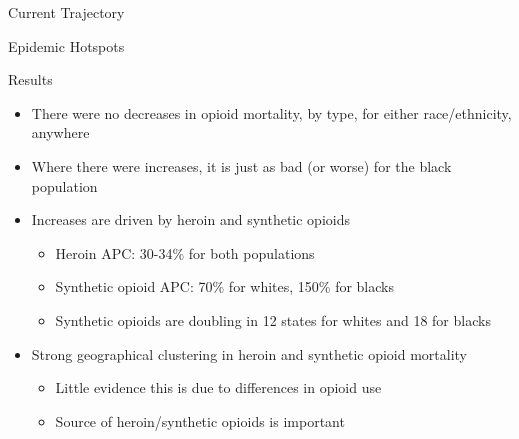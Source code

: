 \documentclass[ignorenonframetext,compress]{beamer}
\providecommand{\tightlist}{%
  \setlength{\itemsep}{0pt}\setlength{\parskip}{0pt}}
\begin{document}
\begin{frame}{Current Trajectory}

\end{frame}

\begin{frame}{Epidemic Hotspots}

\end{frame}

\begin{frame}{Results}

\begin{itemize}[<+->]
\tightlist
\item
  There were no decreases in opioid mortality, by type, for either
  race/ethnicity, anywhere
\item
  Where there were increases, it is just as bad (or worse) for the black
  population
\item
  Increases are driven by heroin and synthetic opioids

  \begin{itemize}[<+->]
  \tightlist
  \item
    Heroin APC: 30-34\% for both populations
  \item
    Synthetic opioid APC: 70\% for whites, 150\% for blacks
  \item
    Synthetic opioids are doubling in 12 states for whites and 18 for
    blacks
  \end{itemize}
\item
  Strong geographical clustering in heroin and synthetic opioid
  mortality

  \begin{itemize}[<+->]
  \tightlist
  \item
    Little evidence this is due to differences in opioid use
  \item
    Source of heroin/synthetic opioids is important
  \end{itemize}
\end{itemize}

\end{frame}
\end{document}
